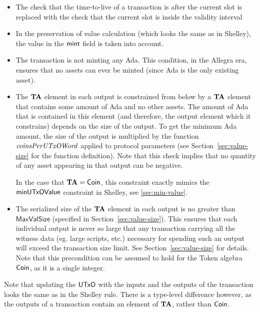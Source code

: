 \begin{itemize}
  \item The check that the time-to-live of a transaction is after the current
  slot is replaced with the check that the current slot is inside the validity interval

  \item In the preservation of value calculation (which looks the same as in
  Shelley), the value in the $\mathsf{mint}$ field is taken into account.

  \item The transaction is not minting any Ada. This condition, in the Allegra
  era, ensures that no assets can ever be minted (since Ada is the only existing
  asset).

  \item The $\mathbf{TA}$ element in each output is constrained from below by a
    $\mathbf{TA}$ element that contains some amount of Ada and no other assets.
    The amount of Ada that is contained in this element (and therefore, the output
    element which it constrains) depends on the
    size of the output. To get the minimum Ada amount, the size of the output is multiplied by
    the function $\mathit{coinsPerUTxOWord}$ applied to protocol parameters
    (see Section~\ref{sec:value-size} for the function definition).
    Note that this check implies that no quantity of any asset appearing in that output can be
    negative.

    In the case that $\mathbf{TA} = \mathsf{Coin}$, this constraint exactly mimics
    the $\mathsf{minUTxOValue}$ constraint in Shelley, see \ref{sec:min-value}.

    \item The serialized size of the $\mathbf{TA}$ element in each output is no greater than $\mathsf{MaxValSize}$
    (specified in Section~\ref{sec:value-size}).
    This ensures that each individual output is never so large that any transaction carrying all the
    witness data (eg. large scripts, etc.) necessary for spending such an output will exceed the transaction size limit.
    See Section~\ref{sec:value-size} for details. Note that this precondition can be assumed to
    hold for the Token algebra $\mathsf{Coin}$, as it is a single integer.
\end{itemize}

Note that updating the $\mathsf{UTxO}$ with the inputs and the outputs of the transaction
looks the same as in the Shelley rule. There is a type-level difference however, as
the outputs of a transaction contain an element of $\mathbf{TA}$, rather than
$\mathsf{Coin}$.


